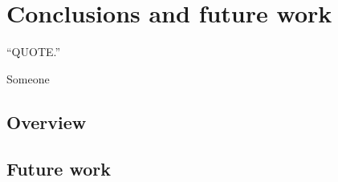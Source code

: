 \documentclass[11pt, a4paper, oneside]{report} %
\begin{document}






\chapter{Conclusions and future work}

\epigraph{``QUOTE.''}{Someone}

\section{Overview}



\section{Future work}
\end{document}
